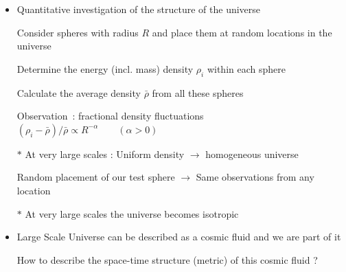 \Tr
\onecolumn
\begin{itemize}
\item Quantitative investigation of the structure of the universe
\item[] Consider spheres with radius $R$ and place them at random locations in the universe
\item[] Determine the energy (incl. mass) density $\rho_{i}$ within each sphere
\item[] Calculate the average density $\bar{\rho}$ from all these spheres
\item[] Observation~: fractional density fluctuations
        $(\rho_{i}-\bar{\rho})/\bar{\rho} \propto R^{-\alpha} \qquad (\alpha>0)$
\item[$\ast$] At very large scales : Uniform density $\rightarrow$ {\blue homogeneous} universe
\item[] Random placement of our test sphere $\rightarrow$ Same observations from any location
\item[$\ast$] At very large scales the universe becomes {\blue isotropic}
\item Large Scale Universe can be described as a {\red cosmic fluid} and we are part of it
\item[] {\blue How to describe the space-time structure (metric) of this cosmic fluid ?}
\end{itemize}
